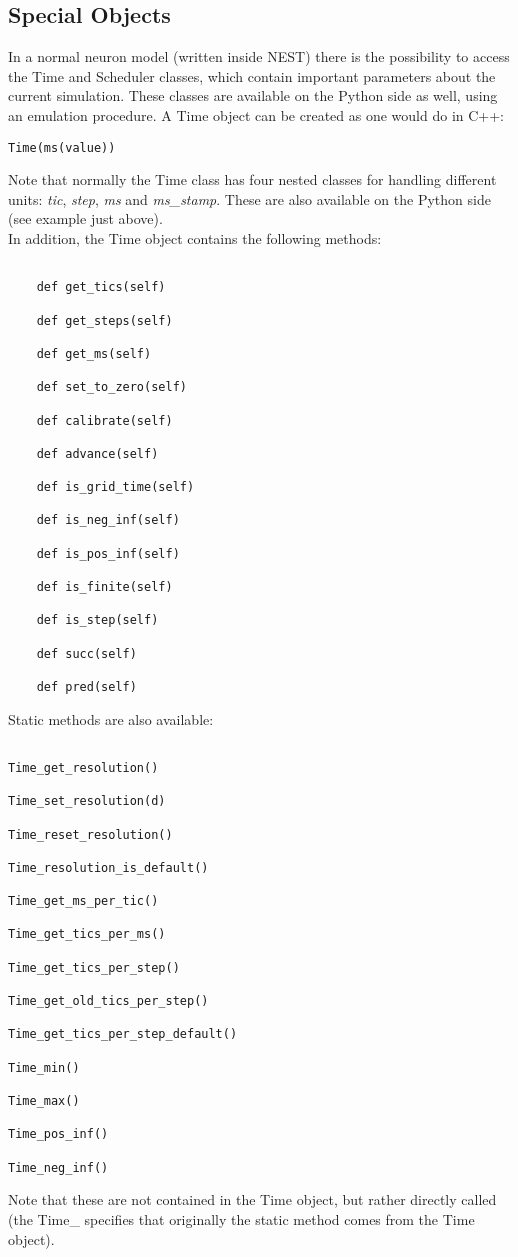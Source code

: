 \documentclass{article}
\begin{document}
\subsection{Special Objects}
In a normal neuron model (written inside NEST) there is the possibility to access the Time and Scheduler classes, which contain important parameters about the current simulation.
These classes are available on the Python side as well, using an emulation procedure.
A Time object can be created as one would do in C++:
\begin{verbatim}
Time(ms(value))
\end{verbatim}
Note that normally the Time class has four nested classes for handling different units: \emph{tic}, \emph{step}, \emph{ms} and \emph{ms\_stamp}. These are also available on the Python side (see example just above).\\
In addition, the Time object contains the following methods:
\begin{verbatim}

    def get_tics(self)

    def get_steps(self)

    def get_ms(self)

    def set_to_zero(self)

    def calibrate(self)

    def advance(self)

    def is_grid_time(self)

    def is_neg_inf(self)

    def is_pos_inf(self)

    def is_finite(self)

    def is_step(self)

    def succ(self)

    def pred(self)

\end{verbatim}
Static methods are also available:
\begin{verbatim}

Time_get_resolution()

Time_set_resolution(d)

Time_reset_resolution()

Time_resolution_is_default()

Time_get_ms_per_tic()

Time_get_tics_per_ms()

Time_get_tics_per_step()

Time_get_old_tics_per_step()

Time_get_tics_per_step_default()

Time_min()

Time_max()

Time_pos_inf()

Time_neg_inf()

\end{verbatim}
Note that these are not contained in the Time object, but rather directly called (the Time\_ specifies that originally the static method comes from the Time object).\\ \\
\end{document}
